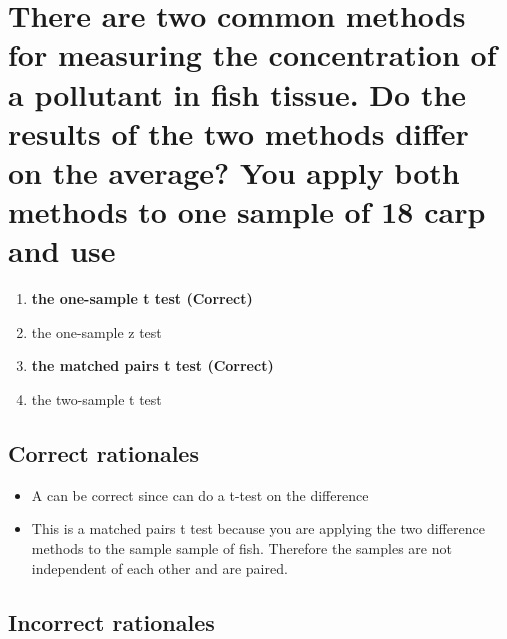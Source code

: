 \documentclass[letterpaper,9pt,twoside,printwatermark=false]{pinp}
\providecommand{\tightlist}{%
  \setlength{\itemsep}{0pt}\setlength{\parskip}{0pt}}
\begin{document}
\section{There are two common methods for measuring the concentration of
a pollutant in fish tissue. Do the results of the two methods differ on
the average? You apply both methods to one sample of 18 carp and
use}\label{there-are-two-common-methods-for-measuring-the-concentration-of-a-pollutant-in-fish-tissue.-do-the-results-of-the-two-methods-differ-on-the-average-you-apply-both-methods-to-one-sample-of-18-carp-and-use}

\begin{enumerate}
\def\labelenumi{\alph{enumi}.}
\tightlist
\item
  \textbf{the one-sample t test (Correct)}
\item
  the one-sample z test
\item
  \textbf{the matched pairs t test (Correct)}
\item
  the two-sample t test
\end{enumerate}

\subsection{Correct rationales}\label{correct-rationales-5}

\begin{itemize}
\tightlist
\item
  A can be correct since can do a t-test on the difference
\item
  This is a matched pairs t test because you are applying the two
  difference methods to the sample sample of fish. Therefore the samples
  are not independent of each other and are paired.
\end{itemize}

\subsection{Incorrect rationales}\label{incorrect-rationales-5}





\end{document}
